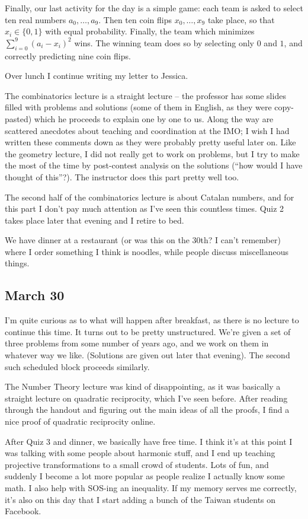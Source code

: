 \documentclass[11pt]{scrreprt}
\begin{document}
Finally, our last activity for the day is a simple game: each team is asked to select ten real numbers $a_0, \dots, a_9$. Then ten coin flips $x_0, \dots, x_9$ take place, so that $x_i \in \{0,1\}$ with equal probability. Finally, the team which minimizes $\sum_{i=0}^9 \left( a_i-x_i \right)^2$ wins.
The winning team does so by selecting only $0$ and $1$, and correctly predicting nine coin flips.

Over lunch I continue writing my letter to Jessica.

The combinatorics lecture is a straight lecture -- the professor has some slides filled with problems and solutions (some of them in English, as they were copy-pasted) which he proceeds to explain one by one to us. Along the way are scattered anecdotes about teaching and coordination at the IMO; I wish I had written these comments down as they were probably pretty useful later on. Like the geometry lecture, I did not really get to work on problems, but I try to make the most of the time by post-contest analysis on the solutions (``how would I have thought of this''?). The instructor does this part pretty well too.

The second half of the combinatorics lecture is about Catalan numbers, and for this part I don't pay much attention as I've seen this countless times.
Quiz 2 takes place later that evening and I retire to bed.

We have dinner at a restaurant (or was this on the 30th? I can't remember) where I order something I think is noodles, while people discuss miscellaneous things.


\subsection{March 30}
I'm quite curious as to what will happen after breakfast, as there is no lecture to continue this time. It turns out to be pretty unstructured. We're given a set of three problems from some number of years ago, and we work on them in whatever way we like. (Solutions are given out later that evening). The second such scheduled block proceeds similarly.

The Number Theory lecture was kind of disappointing, as it was basically a straight lecture on quadratic reciprocity, which I've seen before. After reading through the handout and figuring out the main ideas of all the proofs, I find a nice proof of quadratic reciprocity online.

After Quiz 3 and dinner, we basically have free time. I think it's at this point I was talking with some people about harmonic stuff, and I end up teaching projective transformations to a small crowd of students. Lots of fun, and suddenly I become a lot more popular as people realize I actually know some math. I also help with SOS-ing an inequality. If my memory serves me correctly, it's also on this day that I start adding a bunch of the Taiwan students on Facebook.
\end{document}
